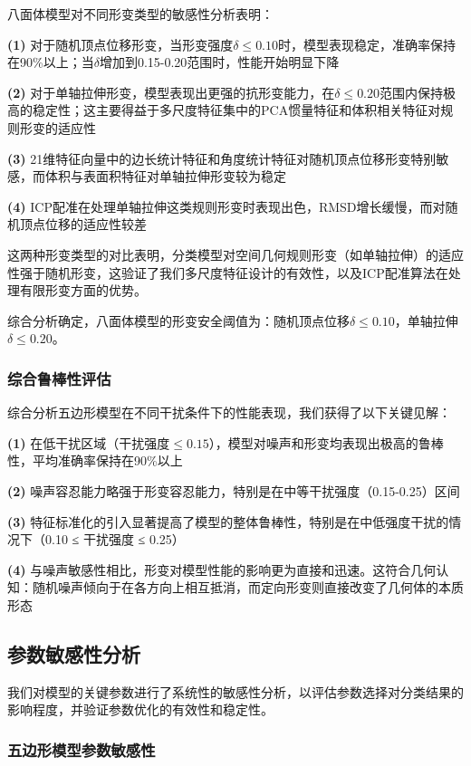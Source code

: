 八面体模型对不同形变类型的敏感性分析表明：

\textbf{(1)} 对于随机顶点位移形变，当形变强度$\delta \leq 0.10$时，模型表现稳定，准确率保持在90\%以上；当$\delta$增加到0.15-0.20范围时，性能开始明显下降

\textbf{(2)} 对于单轴拉伸形变，模型表现出更强的抗形变能力，在$\delta \leq 0.20$范围内保持极高的稳定性；这主要得益于多尺度特征集中的PCA惯量特征和体积相关特征对规则形变的适应性

\textbf{(3)} 21维特征向量中的边长统计特征和角度统计特征对随机顶点位移形变特别敏感，而体积与表面积特征对单轴拉伸形变较为稳定

\textbf{(4)} ICP配准在处理单轴拉伸这类规则形变时表现出色，RMSD增长缓慢，而对随机顶点位移的适应性较差

这两种形变类型的对比表明，分类模型对空间几何规则形变（如单轴拉伸）的适应性强于随机形变，这验证了我们多尺度特征设计的有效性，以及ICP配准算法在处理有限形变方面的优势。

综合分析确定，八面体模型的形变安全阈值为：随机顶点位移$\delta \leq 0.10$，单轴拉伸$\delta \leq 0.20$。

\subsubsection{综合鲁棒性评估}

综合分析五边形模型在不同干扰条件下的性能表现，我们获得了以下关键见解：

\textbf{(1)} 在低干扰区域（干扰强度$\leq 0.15$），模型对噪声和形变均表现出极高的鲁棒性，平均准确率保持在90\%以上

\textbf{(2)} 噪声容忍能力略强于形变容忍能力，特别是在中等干扰强度（0.15-0.25）区间

\textbf{(3)} 特征标准化的引入显著提高了模型的整体鲁棒性，特别是在中低强度干扰的情况下（0.10 ≤ 干扰强度 ≤ 0.25）

\textbf{(4)} 与噪声敏感性相比，形变对模型性能的影响更为直接和迅速。这符合几何认知：随机噪声倾向于在各方向上相互抵消，而定向形变则直接改变了几何体的本质形态

\subsection{参数敏感性分析}

我们对模型的关键参数进行了系统性的敏感性分析，以评估参数选择对分类结果的影响程度，并验证参数优化的有效性和稳定性。

\subsubsection{五边形模型参数敏感性}

